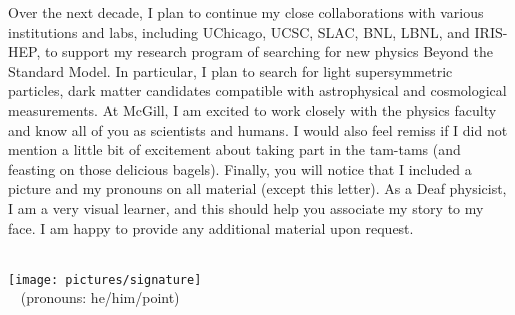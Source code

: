 \documentclass[10pt,letterpaper,sans]{moderncv} %
\makeatletter
\renewcommand*{\makeletterclosing}{
  \@closing\\[0.5em]%
  \texttt{[image: pictures/signature]}\\%
  {\bfseries \@firstname~\@lastname} (pronouns: he/him/point)%
  \ifthenelse{\isundefined{\@enclosure}}{}{%
    \\%
    \vfill%
    {\color{color2}\itshape\enclname: \@enclosure}}}
\makeatother
\begin{document}
Over the next decade, I plan to continue my close collaborations with various institutions and labs, including UChicago, UCSC, SLAC, BNL, LBNL, and IRIS-HEP, to support my research program of searching for new physics Beyond the Standard Model. In particular, I plan to search for light supersymmetric particles, dark matter candidates compatible with astrophysical and cosmological measurements. At McGill, I am excited to work closely with the physics faculty and know all of you as scientists and humans. I would also feel remiss if I did not mention a little bit of excitement about taking part in the tam-tams (and feasting on those delicious bagels). Finally, you will notice that I included a picture and my pronouns on all material (except this letter). As a Deaf physicist, I am a very visual learner, and this should help you associate my story to my face. I am happy to provide any additional material upon request.

\makeletterclosing
\end{document}
